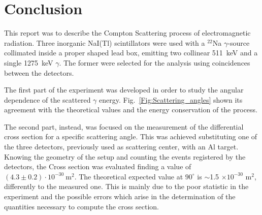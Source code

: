 
\section*{Conclusion}
This report was to describe the Compton Scattering process of electromagnetic radiation. Three inorganic NaI(Tl) scintillators were used with a $^{22}$Na $\gamma$-source collimated inside a proper shaped lead box,  emitting two collinear 511~keV  and a single 1275~keV $\gamma$. The former were selected for the analysis using coincidences between the detectors.

The first part of the experiment  was developed in order to study the angular dependence of the scattered $\gamma$ energy. Fig.~\ref{Fig:Scattering_angles} shown its agreement with the theoretical values and the energy conservation of the process.

The second part, instead, was focused on the measurement of the differential cross section for a specific scattering angle. This was achieved substituting one of the three detectors, previously used as scattering center, with an Al target. Knowing the geometry of the setup and counting the events registered by the detectors, the Cross section was evaluated finding a value of $(4.3\pm0.2)\cdot 10^{-30}\ \text{m}^{2}$.  The theoretical expected value at $90^\circ$ is $\sim$1.5 $\times 10^{-30}$ m$^2$, differently to the measured one. This is mainly due to the poor statistic in the experiment and the possible errors which arise in the determination of the quantities necessary to compute the cross section.

